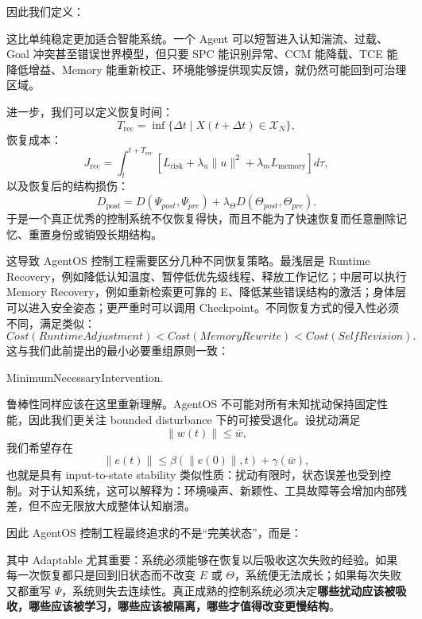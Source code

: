 因此我们定义：
\begin{statementbox}
\centering
{}
\end{statementbox}
这比单纯稳定更加适合智能系统。一个 Agent 可以短暂进入认知湍流、过载、Goal 冲突甚至错误世界模型，但只要 SPC 能识别异常、CCM 能降载、TCE 能降低增益、Memory 能重新校正、环境能够提供现实反馈，就仍然可能回到可治理区域。

进一步，我们可以定义恢复时间：
\[
T_{\mathrm{rec}}
=
\inf
\{
\Delta t
\mid
X(t+\Delta t)\in\mathcal X_N
\},
\]
恢复成本：
\[
J_{\mathrm{rec}}
=
\int_t^{t+T_{\mathrm{rec}}}
\left[
L_{\mathrm{risk}}
+
\lambda_u\|u\|^2
+
\lambda_mL_{\mathrm{memory}}
\right]d\tau,
\]
以及恢复后的结构损伤：
\[
D_{\mathrm{post}}
=
D(
\Psi_{post},
\Psi_{pre}
)
+
\lambda_\Theta
D(
\Theta_{post},
\Theta_{pre}
).
\]
于是一个真正优秀的控制系统不仅恢复得快，而且不能为了快速恢复而任意删除记忆、重置身份或销毁长期结构。

这导致 AgentOS 控制工程需要区分几种不同恢复策略。最浅层是 Runtime Recovery，例如降低认知温度、暂停低优先级线程、释放工作记忆；中层可以执行 Memory Recovery，例如重新检索更可靠的 E、降低某些错误结构的激活；身体层可以进入安全姿态；更严重时可以调用 Checkpoint。不同恢复方式的侵入性必须不同，满足类似：
\[
Cost(
RuntimeAdjustment
)
<
Cost(
MemoryRewrite
)
<
Cost(
SelfRevision
).
\]
这与我们此前提出的最小必要重组原则一致：
\begin{statementbox}
MinimumNecessaryIntervention.
\end{statementbox}

鲁棒性同样应该在这里重新理解。AgentOS 不可能对所有未知扰动保持固定性能，因此我们更关注 bounded disturbance 下的可接受退化。设扰动满足
\[
\|w(t)\|\le \bar w,
\]
我们希望存在
\[
\|e(t)\|
\le
\beta(
\|e(0)\|,t
)
+
\gamma(\bar w),
\]
也就是具有 input-to-state stability 类似性质：扰动有限时，状态误差也受到控制。对于认知系统，这可以解释为：环境噪声、新颖性、工具故障等会增加内部残差，但不应无限放大成整体认知崩溃。

因此 AgentOS 控制工程最终追求的不是“完美状态”，而是：
\begin{statementbox}
\centering
{}
\end{statementbox}
其中 Adaptable 尤其重要：系统必须能够在恢复以后吸收这次失败的经验。如果每一次恢复都只是回到旧状态而不改变 $E$ 或 $\Theta$，系统便无法成长；如果每次失败又都重写 $\Psi$，系统则失去连续性。真正成熟的控制系统必须决定\textbf{哪些扰动应该被吸收，哪些应该被学习，哪些应该被隔离，哪些才值得改变更慢结构}。

